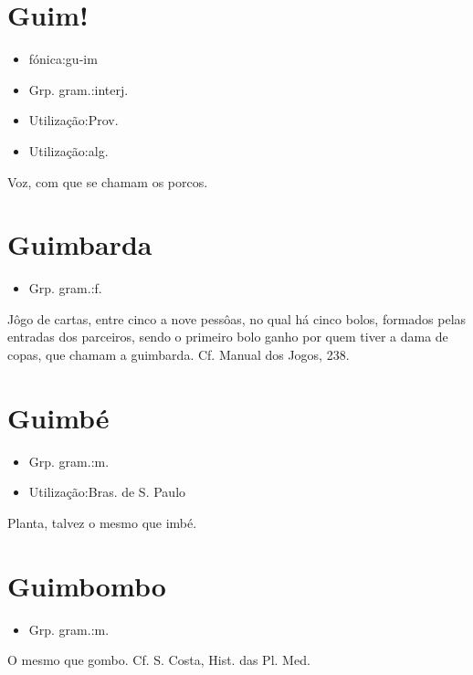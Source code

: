 \section{Guim!}
\begin{itemize}
\item {fónica:gu-im}
\end{itemize}
\begin{itemize}
\item {Grp. gram.:interj.}
\end{itemize}
\begin{itemize}
\item {Utilização:Prov.}
\end{itemize}
\begin{itemize}
\item {Utilização:alg.}
\end{itemize}
Voz, com que se chamam os porcos.
\section{Guimbarda}
\begin{itemize}
\item {Grp. gram.:f.}
\end{itemize}
Jôgo de cartas, entre cinco a nove pessôas, no qual há cinco bolos, formados pelas entradas dos parceiros, sendo o primeiro bolo ganho por quem tiver a dama de copas, que chamam a \textunderscore guimbarda\textunderscore . Cf. \textunderscore Manual dos Jogos\textunderscore , 238.
\section{Guimbé}
\begin{itemize}
\item {Grp. gram.:m.}
\end{itemize}
\begin{itemize}
\item {Utilização:Bras. de S. Paulo}
\end{itemize}
Planta, talvez o mesmo que \textunderscore imbé\textunderscore .
\section{Guimbombo}
\begin{itemize}
\item {Grp. gram.:m.}
\end{itemize}
O mesmo que \textunderscore gombo\textunderscore . Cf. S. Costa, \textunderscore Hist. das Pl. Med.\textunderscore 
